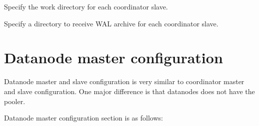   
      Specify the work directory for each coordinator slave.
  
  
      Specify a directory to receive WAL archive for each coordinator slave.
      


\section{\label{pgxcCtl:datanodeMasterConf}Datanode master configuration}
      
  Datanode master and slave configuration is very similar to coordinator master and
  slave configuration.
  One major difference is that datanodes does not have the pooler.
      
  Datanode master configuration section is as follows:
    
